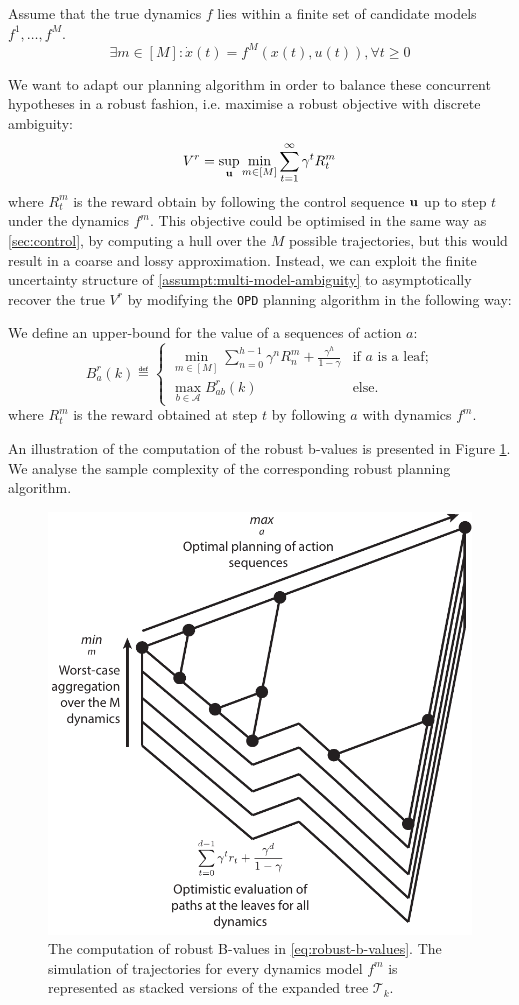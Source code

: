 \documentclass{article}
\begin{document}
\begin{assumption}
\label{assumpt:multi-model-ambiguity}
Assume that the true dynamics $f$ lies within a finite set of candidate models $f^1, \dots, f^M$.
\begin{equation}
\exists m\in[M]: \dot{x}(t) = f^M(x(t), u(t)), \forall t\geq 0
\end{equation}
\end{assumption}
We want to adapt our planning algorithm in order to balance these concurrent hypotheses in a robust fashion, i.e. maximise a robust objective with discrete ambiguity:
\begin{equation}
\label{eq:robust-objective-discrete}
V^r = \sup_{\mathbf{u}}\min_{m\in[M]} \sum_{t=1}^\infty \gamma^t R_t^m
\end{equation}
where $R_t^m$ is the reward obtain by following the control sequence $\mathbf{u}$ up to step $t$ under the dynamics $f^m$.
This objective could be optimised in the same way as \ref{sec:control}, by computing a hull over the $M$ possible trajectories, but this would result in a coarse and lossy approximation. Instead, we can exploit the finite uncertainty structure of \autoref{assumpt:multi-model-ambiguity} to asymptotically recover the true $V^r$ by modifying the \texttt{OPD} planning algorithm in the following way:

\begin{definition} We define an upper-bound for the value of a sequences of action $a$:
\begin{equation}
\label{eq:robust-b-values}
B_a^r(k)  \eqdef
\begin{cases}
\min_{m\in[M]} \sum_{n=0}^{h-1} \gamma^n R_n^m  + \frac{\gamma^h}{1-\gamma} &\text{if } a \text{ is a leaf;}\\
\max_{b\in\mathcal{A}} B_{ab}^r(k) & \text{else.}
\end{cases}
\end{equation}
where $R_t^m$ is the reward obtained at step $t$ by following $a$ with dynamics $f^m$.
\end{definition}
An illustration of the computation of the robust b-values is presented in Figure \ref{fig:drop}. We analyse the sample complexity of the corresponding robust planning algorithm.

\begin{figure}
\centering
\includegraphics[width=0.4\linewidth]{img/robust-control-tree}
\caption{The computation of robust B-values in \eqref{eq:robust-b-values}. The simulation of trajectories for every dynamics model $f^m$ is represented as stacked versions of the expanded tree $\mathcal{T}_k$.}
\label{fig:drop}
\end{figure}
\end{document}
